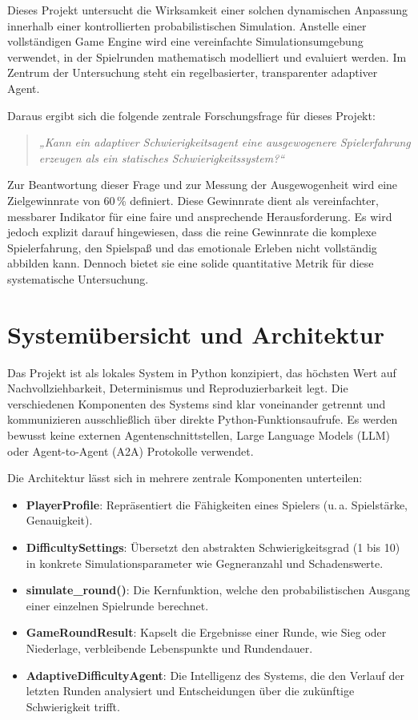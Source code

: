 \documentclass[11pt,a4paper]{article}
\begin{document}
Dieses Projekt untersucht die Wirksamkeit einer solchen dynamischen Anpassung innerhalb einer kontrollierten probabilistischen Simulation. Anstelle einer vollständigen Game Engine wird eine vereinfachte Simulationsumgebung verwendet, in der Spielrunden mathematisch modelliert und evaluiert werden. Im Zentrum der Untersuchung steht ein regelbasierter, transparenter adaptiver Agent.

Daraus ergibt sich die folgende zentrale Forschungsfrage für dieses Projekt:
\begin{quote}
\textit{„Kann ein adaptiver Schwierigkeitsagent eine ausgewogenere Spielerfahrung erzeugen als ein statisches Schwierigkeitssystem?“}
\end{quote}

Zur Beantwortung dieser Frage und zur Messung der Ausgewogenheit wird eine Zielgewinnrate von 60\,\% definiert. Diese Gewinnrate dient als vereinfachter, messbarer Indikator für eine faire und ansprechende Herausforderung. Es wird jedoch explizit darauf hingewiesen, dass die reine Gewinnrate die komplexe Spielerfahrung, den Spielspaß und das emotionale Erleben nicht vollständig abbilden kann. Dennoch bietet sie eine solide quantitative Metrik für diese systematische Untersuchung.

\section{Systemübersicht und Architektur}

Das Projekt ist als lokales System in Python konzipiert, das höchsten Wert auf Nachvollziehbarkeit, Determinismus und Reproduzierbarkeit legt. Die verschiedenen Komponenten des Systems sind klar voneinander getrennt und kommunizieren ausschließlich über direkte Python-Funktionsaufrufe. Es werden bewusst keine externen Agentenschnittstellen, Large Language Models (LLM) oder Agent-to-Agent (A2A) Protokolle verwendet.

Die Architektur lässt sich in mehrere zentrale Komponenten unterteilen:
\begin{itemize}
    \item \textbf{PlayerProfile}: Repräsentiert die Fähigkeiten eines Spielers (u.\,a. Spielstärke, Genauigkeit).
    \item \textbf{DifficultySettings}: Übersetzt den abstrakten Schwierigkeitsgrad (1 bis 10) in konkrete Simulationsparameter wie Gegneranzahl und Schadenswerte.
    \item \textbf{simulate\_round()}: Die Kernfunktion, welche den probabilistischen Ausgang einer einzelnen Spielrunde berechnet.
    \item \textbf{GameRoundResult}: Kapselt die Ergebnisse einer Runde, wie Sieg oder Niederlage, verbleibende Lebenspunkte und Rundendauer.
    \item \textbf{AdaptiveDifficultyAgent}: Die Intelligenz des Systems, die den Verlauf der letzten Runden analysiert und Entscheidungen über die zukünftige Schwierigkeit trifft.
\end{itemize}
\end{document}
